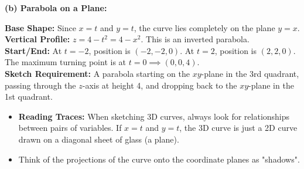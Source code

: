 \begin{solution}
\vspace{0.3cm}
\textbf{(b) Parabola on a Plane:} \\
\begin{minipage}{0.6\textwidth}
\textbf{Base Shape:} Since $x=t$ and $y=t$, the curve lies completely on the plane $y=x$. \\
\textbf{Vertical Profile:} $z = 4 - t^2 = 4 - x^2$. This is an inverted parabola. \\
\textbf{Start/End:} At $t=-2$, position is $(-2, -2, 0)$. At $t=2$, position is $(2, 2, 0)$. The maximum turning point is at $t=0 \implies (0,0,4)$. \\
\textbf{Sketch Requirement:} A parabola starting on the $xy$-plane in the 3rd quadrant, passing through the $z$-axis at height 4, and dropping back to the $xy$-plane in the 1st quadrant.
\end{minipage}%
\hfill
\begin{minipage}{0.35\textwidth}
\begin{center}
\end{center}
\end{minipage}
\end{solution}

\begin{takeaways}
\begin{itemize}[leftmargin=*]
    \item \textbf{Reading Traces:} When sketching 3D curves, always look for relationships between pairs of variables. If $x=t$ and $y=t$, the 3D curve is just a 2D curve drawn on a diagonal sheet of glass (a plane).
    \item Think of the projections of the curve onto the coordinate planes as "shadows". 
\end{itemize}
\end{takeaways}

